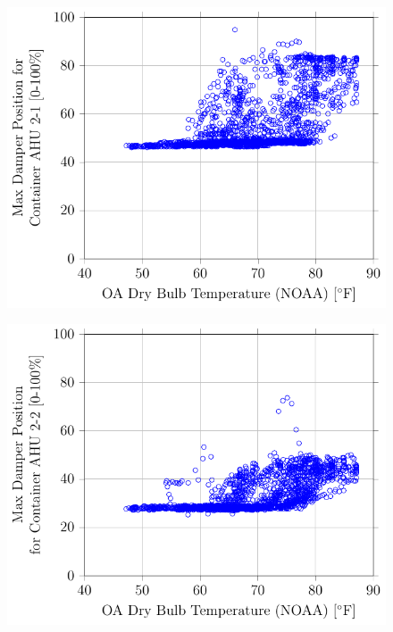 \begin{figure}
\centering
\includegraphics{Plots/MaximumDamperPosition-2-1.pdf}
\caption{}
\label{fig:MaxDamperPositionforContainerAHU21vsOADryBulbTemperatureNOAA}
\end{figure}

\begin{figure}
\centering
\includegraphics{Plots/2016-06-06-1427-MaxDamperPositionforContainerAHU22vsOADryBulbTemperatureNOAA.pdf}
\caption{}
\label{fig:MaxDamperPositionforContainerAHU22vsOADryBulbTemperatureNOAA}
\end{figure}

